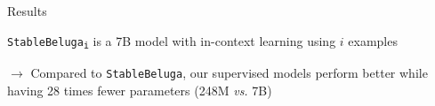 \documentclass[handout,10pt]{beamer}
\begin{document}
\begin{frame}{Results}

\texttt{StableBeluga\textsubscript{i}} is a 7B model with in-context learning using $i$ examples

\begin{table}
    \centering
\caption{$F_1$-scores for character and emotion detection. Significant differences from \texttt{baseline}: ** ($p<0.01$), * ($p<0.05$).}
    \label{tab:result}
\end{table}

\vspace{0.25cm}
\pause

$\rightarrow$ Compared to \texttt{StableBeluga}, our supervised models perform better while having 28 times fewer parameters (248M \textit{vs.} 7B)
    
\end{frame}
\end{document}
